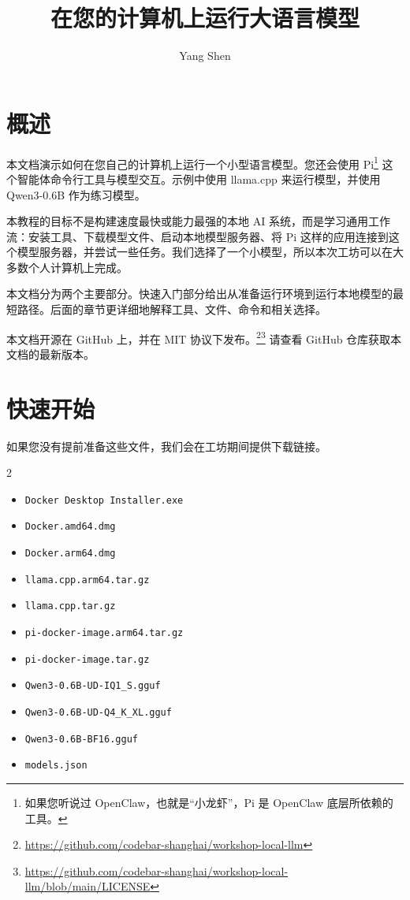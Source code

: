 \documentclass[a4paper,12pt]{article}
\title{在您的计算机上运行大语言模型}
\author{Yang Shen}
\date{}
\begin{document}
\maketitle

\section{概述}

本文档演示如何在您自己的计算机上运行一个小型语言模型。您还会使用 Pi\footnote{如果您听说过 OpenClaw，也就是“小龙虾”，Pi 是 OpenClaw 底层所依赖的工具。} 这个智能体命令行工具与模型交互。示例中使用 llama.cpp 来运行模型，并使用 Qwen3-0.6B 作为练习模型。

本教程的目标不是构建速度最快或能力最强的本地 AI 系统，而是学习通用工作流：安装工具、下载模型文件、启动本地模型服务器、将 Pi 这样的应用连接到这个模型服务器，并尝试一些任务。我们选择了一个小模型，所以本次工坊可以在大多数个人计算机上完成。

本文档分为两个主要部分。快速入门部分给出从准备运行环境到运行本地模型的最短路径。后面的章节更详细地解释工具、文件、命令和相关选择。

本文档开源在 GitHub 上，并在 MIT 协议下发布。\footnote{\url{https://github.com/codebar-shanghai/workshop-local-llm}}\footnote{\url{https://github.com/codebar-shanghai/workshop-local-llm/blob/main/LICENSE}} 请查看 GitHub 仓库获取本文档的最新版本。

\section{快速开始}

如果您没有提前准备这些文件，我们会在工坊期间提供下载链接。

\begin{multicols}{2}
\begin{itemize}
\item \texttt{Docker Desktop Installer.exe}
\item \texttt{Docker.amd64.dmg}
\item \texttt{Docker.arm64.dmg}
\item \texttt{llama.cpp.arm64.tar.gz}
\item \texttt{llama.cpp.tar.gz}
\item \texttt{pi-docker-image.arm64.tar.gz}
\item \texttt{pi-docker-image.tar.gz}
\item \verb|Qwen3-0.6B-UD-IQ1_S.gguf|
\item \verb|Qwen3-0.6B-UD-Q4_K_XL.gguf|
\item \texttt{Qwen3-0.6B-BF16.gguf}
\item \texttt{models.json}
\end{itemize}
\end{multicols}
\end{document}
